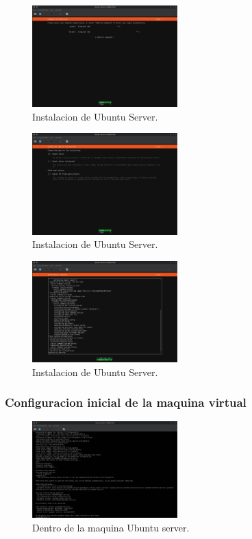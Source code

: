 \documentclass[a4paper,12pt]{article}
\begin{document}
\begin{itemize}
    \begin{figure}[h!]
        \centering
        \includegraphics[width=0.5\textwidth]{10.png}
        \caption{Instalacion de Ubuntu Server.}
    \end{figure}
    \begin{figure}[h!]
        \centering
        \includegraphics[width=0.5\textwidth]{11.png}
        \caption{Instalacion de Ubuntu Server.}
    \end{figure}
    \newpage
    \begin{figure}[h!]
        \centering
        \includegraphics[width=0.5\textwidth]{12.png}
        \caption{Instalacion de Ubuntu Server.}
    \end{figure}

    \subsubsection{Configuracion inicial de la maquina virtual}

    \begin{figure}
        \centering
        \includegraphics[width=0.5\textwidth]{13.png}
        \caption{Dentro de la maquina Ubuntu server.}
    \end{figure}


\end{itemize}
\end{document}
